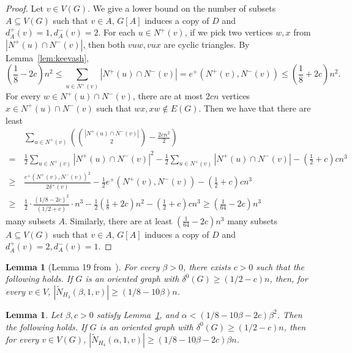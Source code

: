 \documentclass[11pt]{amsart}
\newtheorem{lemma}[theorem]{Lemma}
\newcommand{\wt}{\widetilde}
\begin{document}
\begin{proof}
    Let $v\in V(G)$. 
    We give a lower bound on the number of subsets $A\subseteq V(G)$ such that $v\in A$, $G[A]$ induces a copy of $D$ and $d_A^+(v)=1,d_A^-(v)=2$.
    For each $u\in N^+(v)$, if we pick two vertices $w,x$ from $|N^+(u)\cap N^-(v)|$, then both $vuw,vux$ are cyclic triangles.
    By Lemma~\ref{lem:keevash}, 
    $$\left( \frac{1}{8} - 2c \right) n^2 \le 
    \sum_{u\in N^+(v)}|N^+(u)\cap N^-(v)|=e^+(N^+(v),N^-(v))
    \le \left( \frac{1}{8} + 2c \right) n^2 .$$
    For every $w\in N^+(u)\cap N^-(v)$, there are at most $2cn$ vertices $x\in N^+(u)\cap N^-(v)$ such that $wx,xw\not\in E(G)$.
    Then we have that there are least
    \begin{align*}
        & \sum_{u\in N^+(v)}\left(\binom{|N^+(u)\cap N^-(v)|}{2}-\frac{2cn^2}{2}\right) \\
        = \,
        & \frac{1}{2}\sum_{u\in N^+(v)}|N^+(u)\cap N^-(v)|^2-\frac{1}{2}\sum_{u\in N^+(v)}|N^+(u)\cap N^-(v)|- \left( \frac{1}{2} +c \right) cn^3 \\
        \ge \,
        & \frac{e^+(N^+(v),N^-(v))^2}{2\delta^+(v)}-\frac{1}{2}e^+(N^+(v),N^-(v))-\left( \frac{1}{2} +c \right) cn^3 \\ 
        \ge \,
        & \frac{1}{2} \cdot \frac{(1/8 - 2c)^2}{(1/2 + c)} \cdot n^3- \frac{1}{2} \left( \frac{1}{8} + 2c \right) n^2 - \left( \frac{1}{2} +c \right) cn^3 \ge \left( \frac{1}{64} - 2c \right) n^3 
    \end{align*}
    many subsets $A$. Similarly, there are at least $\left( \frac{1}{64} - 2c \right) n^3$ many subsets $A\subseteq V(G)$ such that $v\in A$, $G[A]$ induces a copy of $D$ and $d_A^+(v)=2,d_A^-(v)=1$.
\end{proof}

\begin{lemma}[Lemma 19 from~\cite{li-molla}]\label{lem:h3_reachable}
    For every $\beta > 0$, there exists $c>0$ such that the following holds. If $G$ is an oriented graph with $\delta^0(G)\ge (1/2-c)n$, 
    then, for every $v\in V$, $|\wt N_{H_3}(\beta,1,v)|\ge (1/8-10\beta)n$.
\end{lemma}

\begin{lemma}\label{lem:h4_reachable}
    Let $\beta, c > 0$ satisfy Lemma~\ref{lem:h3_reachable}, and $ \alpha < \left( 1/8-10\beta-2c \right) \beta^2 $. Then the following holds. 
    If $G$ is an oriented graph with $\delta^0(G)\ge (1/2-c)n$, 
    then for every $v\in V(G)$, $|\wt N_{H_4}(\alpha,1,v)|\ge \left( 1/8-10\beta-2c \right) \beta n$.
\end{lemma}
\end{document}
